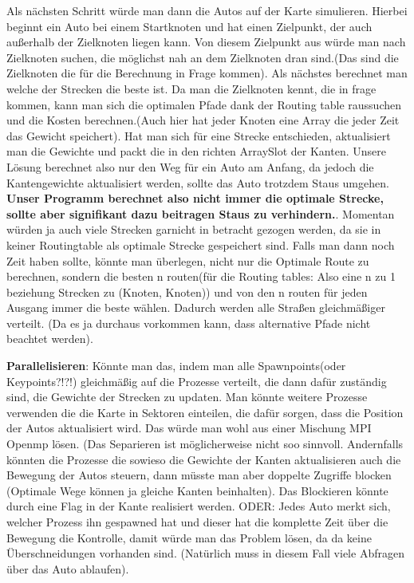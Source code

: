 \documentclass[article, paper=A4,pagesize=auto,11pt,headinclude=true,footinclude=true,BCOR=0mm,DIV=calc]{scrartcl}
\begin{document}
Als nächsten Schritt würde man dann die Autos auf der Karte simulieren. Hierbei beginnt ein Auto bei einem Startknoten und hat einen Zielpunkt, der auch außerhalb der Zielknoten liegen kann. Von diesem Zielpunkt aus würde man nach Zielknoten suchen, die möglichst nah an dem Zielknoten dran sind.(Das sind die Zielknoten die für die Berechnung in Frage kommen).
Als nächstes berechnet man welche der Strecken die beste ist. Da man die Zielknoten kennt, die in frage kommen, kann man sich die optimalen Pfade dank der Routing table raussuchen und die Kosten berechnen.(Auch hier hat jeder Knoten eine Array die jeder Zeit das Gewicht speichert). 
Hat man sich für eine Strecke entschieden, aktualisiert man die Gewichte und packt die in den richten ArraySlot der Kanten. 
Unsere Lösung berechnet also nur den Weg für ein Auto am Anfang, da jedoch die Kantengewichte aktualisiert werden, sollte das Auto trotzdem Staus umgehen. \textbf{Unser Programm berechnet also nicht immer die optimale Strecke, sollte aber signifikant dazu beitragen Staus zu verhindern.}. Momentan würden ja auch viele Strecken garnicht in betracht gezogen werden, da sie in keiner Routingtable als optimale Strecke gespeichert sind. Falls man dann noch Zeit haben sollte, könnte man überlegen, nicht nur die Optimale Route zu berechnen, sondern die besten n routen(für die Routing tables: Also eine n zu 1 beziehung Strecken zu (Knoten, Knoten)) und von den n routen für jeden Ausgang immer die beste wählen. Dadurch werden alle Straßen gleichmäßiger verteilt. (Da es ja durchaus vorkommen kann, dass alternative Pfade nicht beachtet werden).

 \textbf{Parallelisieren}: Könnte man das, indem man alle Spawnpoints(oder Keypoints?!?!) gleichmäßig auf die Prozesse verteilt, die dann dafür zuständig sind, die Gewichte der Strecken zu updaten. Man könnte weitere Prozesse verwenden die die Karte in Sektoren einteilen, die dafür sorgen, dass die Position der Autos aktualisiert wird. Das würde man wohl aus einer Mischung MPI Openmp lösen. (Das Separieren ist möglicherweise nicht soo sinnvoll. Andernfalls könnten die Prozesse die sowieso die Gewichte der Kanten aktualisieren auch die Bewegung der Autos steuern, dann müsste man aber doppelte Zugriffe blocken (Optimale Wege können ja gleiche Kanten beinhalten). Das Blockieren könnte durch eine Flag in der Kante realisiert werden.
 ODER: Jedes Auto merkt sich, welcher Prozess ihn gespawned hat und dieser hat die komplette Zeit über die Bewegung die Kontrolle, damit würde man das Problem lösen, da da keine Überschneidungen vorhanden sind. (Natürlich muss in diesem Fall viele Abfragen über das Auto ablaufen).\\
\end{document}
